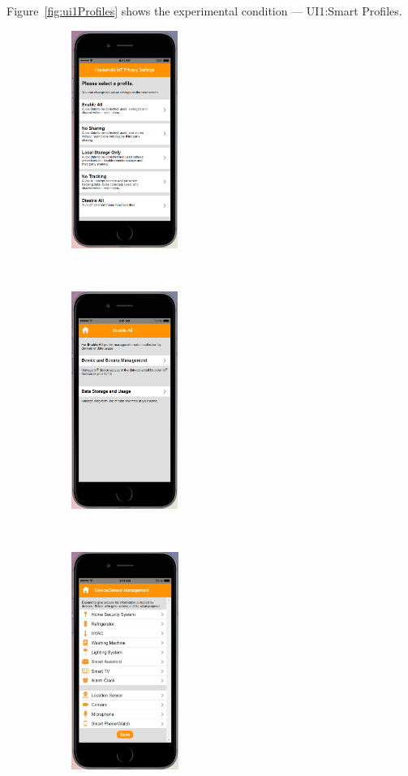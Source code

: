 Figure~\ref{fig:ui1Profiles} shows the experimental condition --- UI1:Smart Profiles.
\begin{figure}[htb]
	\centering
	\begin{subfigure}[t]{0.2\textwidth}
		\centering
		\includegraphics[height=2.8in]{figures/ui1sp1.png}
	\end{subfigure}%
	~~~~~
	\begin{subfigure}[t]{0.2\textwidth}
		\centering
		\includegraphics[height=2.8in]{figures/ui1sp2.png}
	\end{subfigure}%
	~~~~~
	\begin{subfigure}[t]{0.2\textwidth}
		\centering
		\includegraphics[height=2.8in]{figures/ui1sp3.png}

\end{subfigure}
\end{figure}
